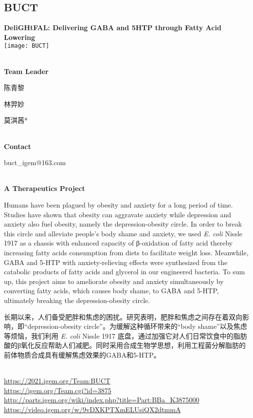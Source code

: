 \subsection{\textcolor{Blu}{ BUCT } }
\vspace{5mm}
\begin{center}
\large{
  \textbf{ DeliGHtFAL: Delivering GABA and 5HTP through Fatty Acid Lowering }\\

  \texttt{[image: BUCT]}
}
\end{center}
\textbf{\\Team Leader}

  陈青黎

  林羿妙

  莫淇茜*


\textbf{\\Contact}

  buct\_igem@163.com


\textbf{\\A Therapeutics Project\\}\begin{spacing}{1.5}

Humans have been plagued by obesity and anxiety for a long period of time. Studies have shown that obesity can aggravate anxiety while depression and anxiety also fuel obesity, namely the depression-obesity circle. In order to break this circle and alleviate people’s body shame and anxiety, we used \textit{E. coli} Nissle 1917 as a chassis with enhanced capacity of β-oxidation of fatty acid thereby increasing fatty acids consumption from diets to facilitate weight loss. Meanwhile, GABA and 5-HTP with anxiety-relieving effects were synthesized from the catabolic products of fatty acids and glycerol in our engineered bacteria. To sum up, this project aims to ameliorate obesity and anxiety simultaneously by converting fatty acids, which causes body shame, to GABA and 5-HTP, ultimately breaking the depression-obesity circle.

长期以来，人们备受肥胖和焦虑的困扰。研究表明，肥胖和焦虑之间存在着双向影响，即“depression-obesity circle”。为缓解这种循环带来的“body shame”以及焦虑等烦恼，我们利用 \textit{E. coli} Nissle 1917 底盘，通过加强它对人们日常饮食中的脂肪酸的β氧化反应帮助人们减肥。同时采用合成生物学思想，利用工程菌分解脂肪的前体物质合成具有缓解焦虑效果的GABA和5-HTP。\end{spacing}
\\

\url{https://2021.igem.org/Team:BUCT }\\
\url{https://igem.org/Team.cgi?id=3875 }\\
\url{http://parts.igem.org/wiki/index.php?title=Part:BBa_K3875000 }\\
\url{https://video.igem.org/w/9vDXKPTXmELUsiQX2dtmmA }\\

